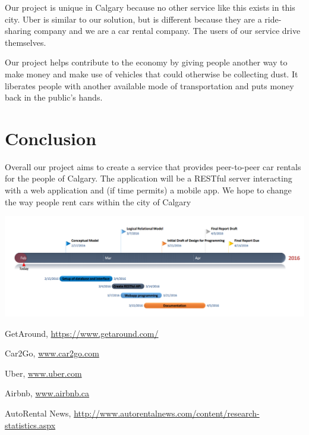 \documentclass{article}
\begin{document}
Our project is unique in Calgary because no other service like this exists in
this city. Uber is similar to our solution, but is different because they are a
ride-sharing company and we are a car rental company. The users of our service
drive themselves.

Our project helps contribute to the economy by giving people another way to
make money and make use of vehicles that could otherwise be collecting dust. It
liberates people with another available mode of transportation and puts money
back in the public's hands.

\section{Conclusion}
Overall our project aims to create a service that provides peer-to-peer car rentals for the people of Calgary.
The application will be a RESTful server interacting with a web application and (if time permits) a mobile app.
We hope to change the way people rent cars within the city of Calgary

\includegraphics[scale=0.45,keepaspectratio]{Timeline}
\begin{thebibliography}{9}

  GetAround,
  \url{https://www.getaround.com/}

  Car2Go,
  \url{www.car2go.com}

  Uber,
  \url{www.uber.com}

  Airbnb,
  \url{www.airbnb.ca}

  AutoRental News,
  \url{http://www.autorentalnews.com/content/research-statistics.aspx}

\end{thebibliography}
\end{document}
